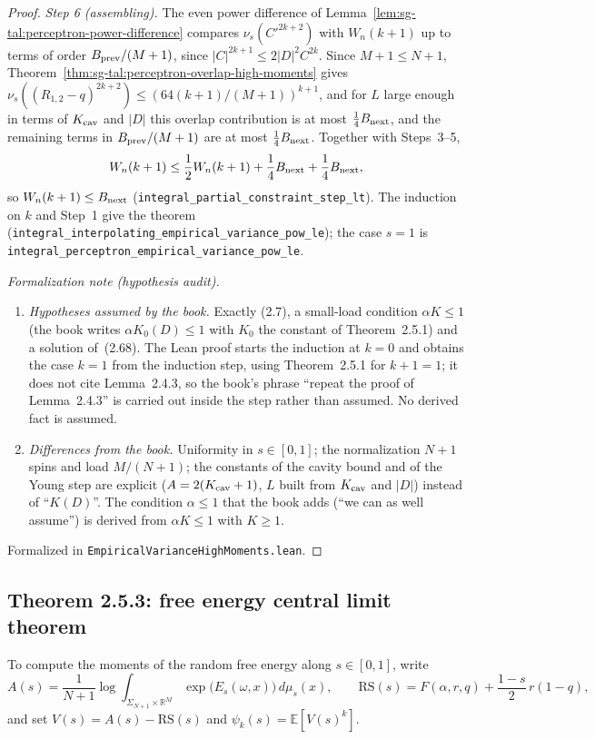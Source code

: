 \begin{proof}
\emph{Step 6 (assembling).} The even power difference of Lemma~\ref{lem:sg-tal:perceptron-power-difference} compares
$\nu_s(C'^{2k+2})$ with $W_n(k+1)$ up to terms of order $B_{\rm prev}/(M+1)$, since
$|C|^{2k+1}\le 2|D|^2C^{2k}$. Since $M+1\le N+1$, Theorem~\ref{thm:sg-tal:perceptron-overlap-high-moments} gives
$\nu_s((R_{1,2}-q)^{2k+2})\le(64(k+1)/(M+1))^{k+1}$, and for $L$ large enough in terms of $K_{\rm cav}$ and $|D|$ this
overlap contribution is at most $\frac14B_{\rm next}$, and the remaining terms in $B_{\rm prev}/(M+1)$ are at most
$\frac14B_{\rm next}$. Together with Steps~3--5,
\[
 W_n(k+1)\le\frac12W_n(k+1)+\frac14B_{\rm next}+\frac14B_{\rm next},
\]
so $W_n(k+1)\le B_{\rm next}$ (\texttt{integral\_partial\_constraint\_step\_lt}). The induction on $k$ and
Step~1 give the theorem (\texttt{integral\_interpolating\_empirical\_variance\_pow\_le}); the case $s=1$ is
\texttt{integral\_perceptron\_empirical\_variance\_pow\_le}.

\emph{Formalization note (hypothesis audit).}
\begin{enumerate}
\item \emph{Hypotheses assumed by the book.} Exactly (2.7), a small-load condition $\alpha K\le 1$ (the book
writes $\alpha K_0(D)\le1$ with $K_0$ the constant of Theorem~2.5.1) and a solution of~(2.68). The Lean proof
starts the induction at $k=0$ and obtains the case $k=1$ from the induction step, using Theorem~2.5.1 for
$k+1=1$; it does not cite Lemma~2.4.3, so the book's phrase ``repeat the proof of Lemma~2.4.3'' is carried out
inside the step rather than assumed. No derived fact is assumed.
\item \emph{Differences from the book.} Uniformity in $s\in[0,1]$; the normalization $N+1$ spins and load
$M/(N+1)$; the constants of the cavity bound and of the Young step are explicit ($A=2(K_{\rm cav}+1)$,
$L$ built from $K_{\rm cav}$ and $|D|$) instead of ``$K(D)$''. The condition $\alpha\le1$ that the book
adds (``we can as well assume'') is derived from $\alpha K\le1$ with $K\ge1$.
\end{enumerate}
Formalized in \texttt{EmpiricalVarianceHighMoments.lean}.
\end{proof}

\subsection{Theorem 2.5.3: free energy central limit theorem}\label{sub:sg-tal:perceptron-free-energy-clt}

To compute the moments of the random free energy along $s\in[0,1]$, write
\[
 A(s)=\frac{1}{N+1}\log\int_{\Sigma_{N+1}\times\mathbb R^M}\exp\bigl(E_s(\omega,x)\bigr)\,d\mu_s(x),\qquad
 \mathrm{RS}(s)=F(\alpha,r,q)+\frac{1-s}{2}\,r(1-q),
\]
and set $V(s)=A(s)-\mathrm{RS}(s)$ and $\psi_k(s)=\mathbb E[V(s)^k]$.

